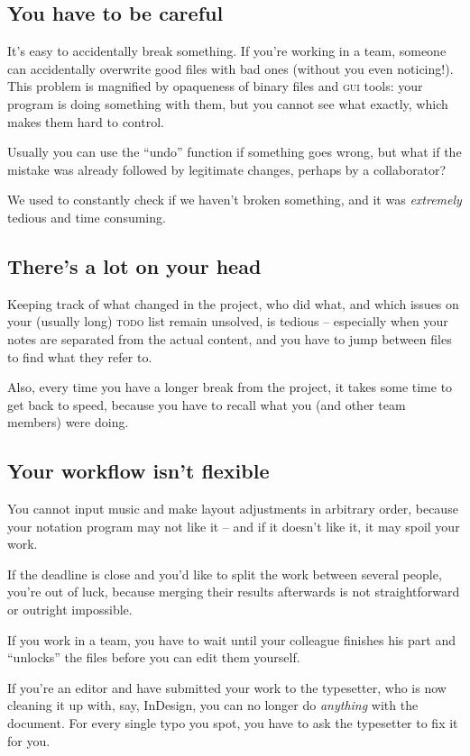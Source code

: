 \documentclass[11pt,a4paper]{article}
\begin{document}
\subsection{You have to be careful}
It's easy to accidentally break something. If you're working in a team,
someone can accidentally overwrite good files with bad ones (without you even noticing!).
This problem is magnified by opaqueness of binary files and \textsc{gui}
tools: your program is doing something with them, but you cannot see what exactly,
which makes them hard to control.

Usually you can use the “undo” function if something goes wrong,
but what if the mistake was already followed by legitimate changes, perhaps
by a collaborator?

We used to constantly check if we haven't broken something,
and it was \emph{extremely} tedious and time consuming.

\subsection{There's a lot on your head}
Keeping track of what changed in the project, who did what,
and which issues on your (usually long) \textsc{todo} list remain
unsolved, is tedious -- especially when your notes are separated from
the actual content, and you have to jump between files to find
what they refer to.

Also, every time you have a longer break from the project, it takes some
time to get back to speed, because you have to recall what you
(and other team members) were doing.

\subsection{Your workflow isn't flexible}
You cannot input music and make layout adjustments in arbitrary order, because
your notation program may not like it -- and if it doesn't like it,
it may spoil your work.

If the deadline is close and you'd like to split the work between several people,
you're out of luck, because merging their results afterwards is not straightforward
or outright impossible.

If you work in a team, you have to wait until your colleague finishes his part
and “unlocks” the files before you can edit them yourself.

If you're an editor and have submitted your work to the typesetter, who is now cleaning it up with, say, InDesign, you can no longer do \emph{anything} with
the document.  For every single typo you spot, you have to ask the typesetter to fix it
for you.
\end{document}
